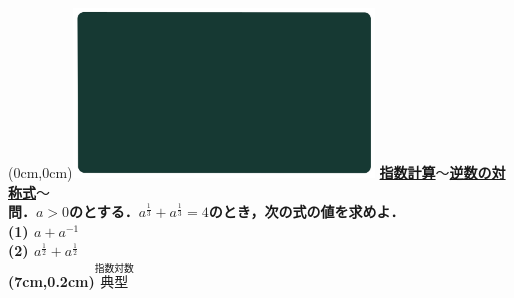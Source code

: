 \documentclass[10pt,
fleqn,
dvipdfmx,
uplatex
]{jsarticle}
\begin{document}
\newpage



\at(0cm,0cm){\includegraphics[width=8cm,bb=0 0 1920 1080]{./media_local/smart_background/指数対数.jpeg}}
{\color{orange}\bf\boldmath\Large\underline{指数計算$〜$逆数の対称式$〜$}}\vspace{0.3zw}\\
\Large 
\bf\boldmath 問．$a>0$のとする．$a^{\frac{1}{3}}+a^{\frac{1}{3}}=4$のとき，次の式の値を求めよ．\\
(1)  $a+a^{-1}$\\
(2)  $a^{\frac{1}{2}}+a^{\frac{1}{2}}$\\

\at(7cm,0.2cm){\small\color{bradorange}$\overset{\text{指数対数}}{\text{典型}}$}
\end{document}
